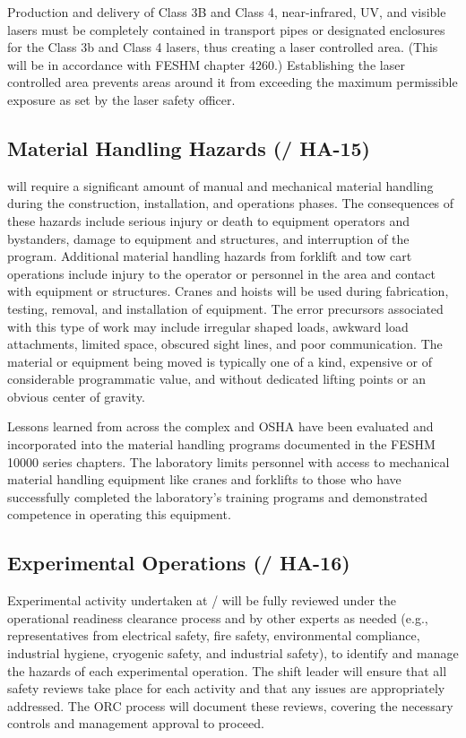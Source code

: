 Production and delivery of Class 3B and Class 4, near-infrared, UV,
and visible lasers must be completely contained in
transport pipes or designated enclosures for the Class 3b and Class 4
lasers, thus creating a laser controlled area. (This will be in
accordance with \fnal FESHM chapter 4260.)  Establishing the laser controlled area
prevents areas around it from exceeding the maximum
permissible exposure as set by the \fnal laser safety officer.

\subsection{Material Handling Hazards (/ HA-15)}

 will require a significant amount of manual and mechanical
material handling during the construction, installation, and operations
phases.  The consequences of these hazards include serious injury or
death to equipment operators and bystanders, damage to equipment and
structures, and interruption of the program.  Additional material
handling hazards from forklift and tow cart operations include injury
to the operator or personnel in the area and contact with equipment or
structures. Cranes and hoists will be used during fabrication,
testing, removal, and installation of equipment. The error precursors
associated with this type of work may include irregular shaped loads,
awkward load attachments, limited space, obscured sight lines, and
poor communication.  The material or equipment being moved is
typically one of a kind, expensive or of considerable programmatic
value, and without dedicated lifting points or an obvious center
of gravity.

Lessons learned from across the  complex and OSHA have been
evaluated and incorporated into the \fnal material handling
programs documented in the FESHM 10000 series chapters.  The
laboratory limits personnel with access to mechanical material
handling equipment like cranes and forklifts to those who have
successfully completed the laboratory's training programs and
demonstrated competence in operating this equipment.


\subsection{Experimental Operations (/ HA-16)}

Experimental activity undertaken at / will be fully reviewed
under the operational readiness clearance process and by other
experts as needed (e.g., representatives from
electrical safety, fire safety, environmental compliance, industrial
hygiene, cryogenic safety, and industrial safety), to identify and
manage the hazards of each experimental operation. The shift leader
will ensure that all safety reviews take place for each
activity and that any issues are appropriately addressed. The ORC 
process will document these reviews, covering the necessary controls
and management approval to proceed.


